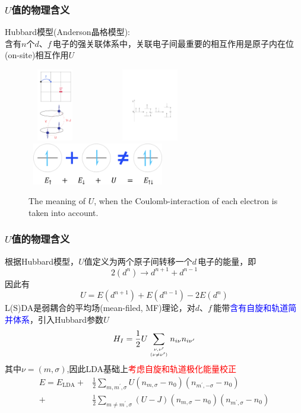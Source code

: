 {\frame
{
\frametitle{$U$值的物理含义}
\textrm{Hubbard}模型(\textrm{Anderson晶格模型}):\\含有$n$个$d$、$f$\,电子的强关联体系中，关联电子间最重要的相互作用是原子内在位(\textrm{on-site})相互作用$U$
\begin{figure}[h!]
\centering
\includegraphics[height=1.25in,width=0.92in,viewport=1 1 240 375,clip]{Figures/LDA_U-1.png}
\includegraphics[height=1.25in,width=2.32in,viewport=110 210 545 455,clip]{Figures/LDA_U.pdf}
\includegraphics[height=0.72in,width=2.42in,viewport=0 0 1430 460,clip]{Figures/correalation-energy.png}
\caption{\tiny \textrm{The meaning of $U$, when the Coulomb-interaction of each electron is taken into account.}}%
\label{Tetrahedron_weight}
\end{figure}
}

\frame
{
\frametitle{$U$值的物理含义}
根据\textrm{Hubbard}模型，\textrm{$U$}值定义为两个原子间转移一个$d$\,电子的能量，即
$$2(d^n)\rightarrow d^{n+1}+d^{n-1}$$
因此有
$$U=E(d^{n+1})+E(d^{n-1})-2E(d^n)$$
\textrm{L(S)DA}是弱耦合的平均场(\textrm{mean-filed, MF})理论，对$d$、$f$\,能带\textcolor{blue}{含有自旋和轨道简并体系}，引入\textrm{Hubbard}参数$U$
\begin{displaymath}
	H_I=\frac12U\sum\limits_{\nu,\nu^{\prime}\atop(\nu\neq\nu^{\prime})}n_{i\nu}n_{i\nu^{\prime}}
\end{displaymath}
其中$\nu=(m,\sigma)$,因此\textrm{LDA}基础上\textcolor{red}{考虑自旋和轨道极化能量校正}
\begin{displaymath}
	\begin{aligned}
		E=E_{\mathrm{LDA}}+&\frac12\sum_{m,m^{\prime},\sigma}U(n_{m,\sigma}-n_0)(n_{m^{\prime},-\sigma}-n_0)\\
		+&\frac12\sum_{m\neq m^{\prime},\sigma}(U-J)(n_{m,\sigma}-n_0)(n_{m^{\prime},\sigma}-n_0)
	\end{aligned}
\end{displaymath}
}

}
